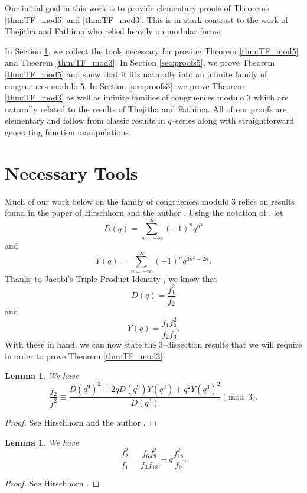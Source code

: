 \documentclass[10pt, reqno]{amsart}
\theoremstyle{theorem}
\newtheorem{lemma}[theorem]{Lemma}
\theoremstyle{definition}
\theoremstyle{example}
\begin{document}
Our initial goal in this work is to provide elementary proofs of Theorems \ref{thm:TF_mod5} and \ref{thm:TF_mod3}.  This is in stark contrast to the work of Thejitha and Fathima \cite{TF} who relied heavily on modular forms.  

In Section \ref{sec:tools}, we collect the tools necessary for proving Theorem \ref{thm:TF_mod5} and Theorem \ref{thm:TF_mod3}.  In Section \ref{sec:proofs5}, we prove Theorem \ref{thm:TF_mod5} and show that it fits naturally into an infinite family of congruences modulo 5.  In Section \ref{sec:proofs3}, we prove Theorem \ref{thm:TF_mod3} as well as infinite families of congruences modulo 3 which are naturally related to the results of Thejitha and Fathima.  All of our proofs are elementary and follow from classic results in $q$--series along with straightforward generating function manipulations.  

\section{Necessary Tools}
\label{sec:tools}

Much of our work below on the family of congruences modulo 3 relies on results found in the paper of Hirschhorn and the author \cite{HS2005}.  Using the notation of \cite{HS2005}, let 
$$D(q) = \sum_{n=-\infty}^\infty (-1)^nq^{n^2}$$ 
and 
$$Y(q) = \sum_{n=-\infty}^\infty (-1)^nq^{3n^2-2n}.$$ 
Thanks to Jacobi's Triple Product Identity \cite[(1.1.1)]{Hir}, we know that 
\begin{equation}
\label{D_prod}
D(q) = \frac{f_1^2}{f_2} 
\end{equation}
and 
\begin{equation}
\label{Y_prod}
Y(q) = \frac{f_1f_6^2}{f_2f_3}.
\end{equation}
With these in hand, we can now state the 3--dissection results that we will require in order to prove Theorem \ref{thm:TF_mod3}.  

\begin{lemma}
\label{lem:f2overf1squared_3diss} 
We have 
$$
\frac{f_2}{f_1^2} \equiv  \frac{D(q^9)^2 +2qD(q^9)Y(q^3)+q^2Y(q^3)^2}{D(q^3)} \pmod{3}.
$$
\end{lemma}
\begin{proof}
See Hirschhorn and the author \cite{HS2005}.  
\end{proof}

\begin{lemma}
\label{lem:psi_3diss}
We have 
$$
\frac{f_2^2}{f_1} = \frac{f_6f_9^2}{f_3f_{18}} +q\frac{f_{18}^2}{f_9}.  
$$
\end{lemma}
\begin{proof}
See Hirschhorn \cite[(14.3.3)]{Hir}.
\end{proof}
\end{document}
